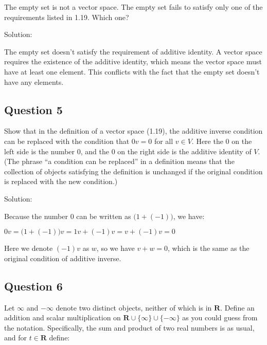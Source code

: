 \documentclass[12pt, letterpaper, oneside]{book}
\begin{document}
The empty set is not a vector space. The empty set fails to satisfy only one of
the requirements listed in 1.19. Which one?

Solution:

The empty set doesn't satisfy the requirement of additive identity. A vector
space requires the existence of the additive identity, which means the vector
space must have at least one element. This conflicts with the fact that the
empty set doesn't have any elements.

\subsection{Question 5}

Show that in the definition of a vector space (1.19), the additive inverse
condition can be replaced with the condition that $0v = 0$ for all $v \in V$.
Here the $0$ on the left side is the number 0, and the $0$ on the right side is
the additive identity of $V$. (The phrase ``a condition can be replaced'' in a
definition means that the collection of objects satisfying the definition is
unchanged if the original condition is replaced with the new condition.)

Solution:

Because the number $0$ can be written as $\bigl(1 + (-1)\bigr)$, we have:

$0v = \bigl(1 + (-1)\bigr)v = 1v + (-1)v = v + (-1)v = 0$

Here we denote $(-1)v$ as $w$, so we have $v + w = 0$, which is the same as the
original condition of additive inverse.

\subsection{Question 6}

Let $\infty$ and $-\infty$ denote two distinct objects, neither of which is in
$\mathbf{R}$. Define an addition and scalar multiplication on $\mathbf{R} \cup
\{\infty\} \cup \{-\infty\}$ as you could guess from the notation. Specifically,
the sum and product of two real numbers is as usual, and for $t \in \mathbf{R}$
define:
\end{document}
